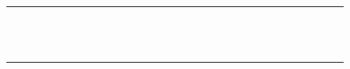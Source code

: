 \documentclass[10pt]{article}
\begin{document}
\begin{center}
\begin{tabular}{|c|c|c|c|c|c|c|c|c|c|c|c|c|c|c|c|c|c|c|c|c|c|c|c|c|c|c|c|c|c|}
\hline
 &  &  &  &  &  &  &  &  &  &  &  &  &  &  &  &  &  &  &  &  &  &  &  &  &  &  &  &  &  \\
\hline
 &  &  &  &  &  &  &  &  &  &  &  &  &  &  &  &  &  &  &  &  &  &  &  &  &  &  &  &  &  \\
\hline
 &  &  &  &  &  &  &  &  &  &  &  &  &  &  &  &  &  &  &  &  &  &  &  &  &  &  &  &  &  \\
\hline
 &  &  &  &  &  &  &  &  &  &  &  &  &  &  &  &  &  &  &  &  &  &  &  &  &  &  &  &  &  \\
\hline
 &  &  &  &  &  &  &  &  &  &  &  &  &  &  &  &  &  &  &  &  &  &  &  &  &  &  &  &  &  \\
\hline
 &  &  &  &  &  &  &  &  &  &  &  &  &  &  &  &  &  &  &  &  &  &  &  &  &  &  &  &  &  \\
\hline
 &  &  &  &  &  &  &  &  &  &  &  &  &  &  &  &  &  &  &  &  &  &  &  &  &  &  &  &  &  \\
\hline
 &  &  &  &  &  &  &  &  &  &  &  &  &  &  &  &  &  &  &  &  &  &  &  &  &  &  &  &  &  \\
\hline
 &  &  &  &  &  &  &  &  &  &  &  &  &  &  &  &  &  &  &  &  &  &  &  &  &  &  &  &  &  \\
\hline
 &  &  &  &  &  &  &  &  &  &  &  &  &  &  &  &  &  &  &  &  &  &  &  &  &  &  &  &  &  \\
\hline
 &  &  &  &  &  &  &  &  &  &  &  &  &  &  &  &  &  &  &  &  &  &  &  &  &  &  &  &  &  \\
\hline
 &  &  &  &  &  &  &  &  &  &  &  &  &  &  &  &  &  &  &  &  &  &  &  &  &  &  &  &  &  \\
\hline
 &  &  &  &  &  &  &  &  &  &  &  &  &  &  &  &  &  &  &  &  &  &  &  &  &  &  &  &  &  \\
\hline
 &  &  &  &  &  &  &  &  &  &  &  &  &  &  &  &  &  &  &  &  &  &  &  &  &  &  &  &  &  \\
\hline
\end{tabular}
\end{center}
\end{document}
